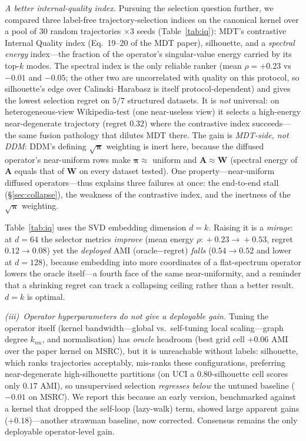 \documentclass[10pt,twocolumn]{article}
\newcommand{\W}{\mathbf{W}}
\newcommand{\A}{\mathbf{A}}
\newcommand{\bp}{\boldsymbol{\pi}}
\begin{document}
\emph{A better internal-quality index.} Pursuing the selection question further, we compared three
label-free trajectory-selection indices on the canonical kernel over a pool of $30$ random
trajectories $\times 3$ seeds (Table~\ref{tab:iq}): MDT's contrastive Internal Quality index
(Eq.~19--20 of the MDT paper), silhouette, and a \emph{spectral energy} index---the fraction of the
operator's singular-value energy carried by its top-$k$ modes. The spectral index is the only reliable
ranker (mean $\rho=+0.23$ vs $-0.01$ and $-0.05$; the other two are uncorrelated with quality on this
protocol, so silhouette's edge over Calinski--Harabasz is itself protocol-dependent) and gives the
lowest selection regret on $5/7$ structured datasets. It is \emph{not} universal: on heterogeneous-view
Wikipedia-test (one near-useless view) it selects a high-energy near-degenerate trajectory
(regret $0.32$) where the contrastive index succeeds---the same fusion pathology that dilutes MDT
there. The gain is \emph{MDT-side, not DDM}: DDM's defining $\sqrt{\bp}$ weighting is inert here, because
the diffused operator's near-uniform rows make $\bp\!\approx\!$ uniform and $\A\!\approx\!\W$
(spectral energy of $\A$ equals that of $\W$ on every dataset tested). One property---near-uniform
diffused operators---thus explains three failures at once: the end-to-end stall (\S\ref{sec:collapse}),
the weakness of the contrastive index, and the inertness of the $\sqrt{\bp}$ weighting.

Table~\ref{tab:iq} uses the SVD embedding dimension $d{=}k$. Raising it is a \emph{mirage}: at
$d{=}64$ the selector metrics \emph{improve} (mean energy $\rho\!:\!{+}0.23\!\to\!{+}0.53$, regret
$0.12\!\to\!0.08$) yet the \emph{deployed} AMI (oracle$-$regret) \emph{falls} ($0.54\!\to\!0.52$ and
lower at $d{=}128$), because embedding into more coordinates of a flat-spectrum operator lowers the
oracle itself---a fourth face of the same near-uniformity, and a reminder that a shrinking regret can
track a collapsing ceiling rather than a better result. $d{=}k$ is optimal.

\emph{(iii)~Operator hyperparameters do not give a deployable gain.} Tuning the operator itself
(kernel bandwidth---global vs.\ self-tuning local scaling---graph degree $k_{nn}$, and
normalisation) has \emph{oracle} headroom (best grid cell $+0.06$ AMI over the paper kernel on MSRC),
but it is unreachable without labels: silhouette, which ranks trajectories acceptably, mis-ranks these
configurations, preferring near-degenerate high-silhouette partitions (on UCI a $0.80$-silhouette cell
scores only $0.17$ AMI), so unsupervised selection \emph{regresses below} the untuned baseline
($-0.01$ on MSRC). We report this because an early version, benchmarked against a kernel that dropped
the self-loop (lazy-walk) term, showed large apparent gains ($+0.18$)---another strawman baseline, now
corrected. Consensus remains the only deployable operator-level gain.
\end{document}
